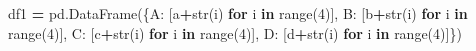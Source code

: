 \documentclass[
  letterpaper,
]{scrbook}
\newenvironment{Shaded}{\begin{snugshade}}{\end{snugshade}}
\newcommand{\BuiltInTok}[1]{#1}
\newcommand{\ControlFlowTok}[1]{\textcolor[rgb]{0.13,0.29,0.53}{\textbf{#1}}}
\newcommand{\DecValTok}[1]{\textcolor[rgb]{0.00,0.00,0.81}{#1}}
\newcommand{\KeywordTok}[1]{\textcolor[rgb]{0.13,0.29,0.53}{\textbf{#1}}}
\newcommand{\NormalTok}[1]{#1}
\newcommand{\OperatorTok}[1]{\textcolor[rgb]{0.81,0.36,0.00}{\textbf{#1}}}
\newcommand{\StringTok}[1]{\textcolor[rgb]{0.31,0.60,0.02}{#1}}
\begin{document}
\begin{Shaded}
\begin{Highlighting}[]
\NormalTok{df1 }\OperatorTok{=}\NormalTok{ pd.DataFrame(\{}\StringTok{\textquotesingle{}A\textquotesingle{}}\NormalTok{: [}\StringTok{\textquotesingle{}a\textquotesingle{}}\OperatorTok{+}\BuiltInTok{str}\NormalTok{(i) }\ControlFlowTok{for}\NormalTok{ i }\KeywordTok{in} \BuiltInTok{range}\NormalTok{(}\DecValTok{4}\NormalTok{)],}
    \StringTok{\textquotesingle{}B\textquotesingle{}}\NormalTok{: [}\StringTok{\textquotesingle{}b\textquotesingle{}}\OperatorTok{+}\BuiltInTok{str}\NormalTok{(i) }\ControlFlowTok{for}\NormalTok{ i }\KeywordTok{in} \BuiltInTok{range}\NormalTok{(}\DecValTok{4}\NormalTok{)],}
    \StringTok{\textquotesingle{}C\textquotesingle{}}\NormalTok{: [}\StringTok{\textquotesingle{}c\textquotesingle{}}\OperatorTok{+}\BuiltInTok{str}\NormalTok{(i) }\ControlFlowTok{for}\NormalTok{ i }\KeywordTok{in} \BuiltInTok{range}\NormalTok{(}\DecValTok{4}\NormalTok{)],}
    \StringTok{\textquotesingle{}D\textquotesingle{}}\NormalTok{: [}\StringTok{\textquotesingle{}d\textquotesingle{}}\OperatorTok{+}\BuiltInTok{str}\NormalTok{(i) }\ControlFlowTok{for}\NormalTok{ i }\KeywordTok{in} \BuiltInTok{range}\NormalTok{(}\DecValTok{4}\NormalTok{)]\})}


\end{Highlighting}
\end{Shaded}
\end{document}
